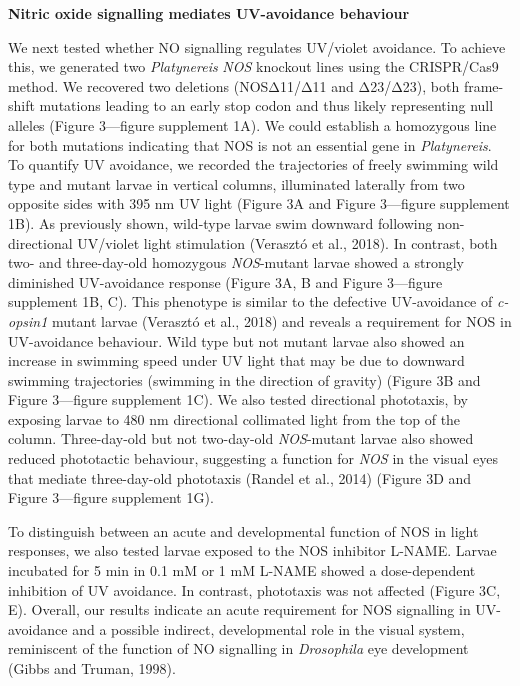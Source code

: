 \documentclass[
  10pt,
  onecolumn]{article}
\begin{document}
\textbf{Nitric oxide signalling mediates UV-avoidance behaviour}

We next tested whether NO signalling regulates UV/violet avoidance. To
achieve this, we generated two \emph{Platynereis} \emph{NOS} knockout
lines using the CRISPR/Cas9 method. We recovered two deletions
(NOSΔ11/Δ11 and Δ23/Δ23), both frame-shift mutations leading to an early
stop codon and thus likely representing null alleles (Figure 3---figure
supplement 1A). We could establish a homozygous line for both mutations
indicating that NOS is not an essential gene in \emph{Platynereis}. To
quantify UV avoidance, we recorded the trajectories of freely swimming
wild type and mutant larvae in vertical columns, illuminated laterally
from two opposite sides with 395 nm UV light (Figure 3A and Figure
3---figure supplement 1B). As previously shown, wild-type larvae swim
downward following non-directional UV/violet light stimulation (Verasztó
et al., 2018). In contrast, both two- and three-day-old homozygous
\emph{NOS}-mutant larvae showed a strongly diminished UV-avoidance
response (Figure 3A, B and Figure 3---figure supplement 1B, C). This
phenotype is similar to the defective UV-avoidance of \emph{c-opsin1}
mutant larvae (Verasztó et al., 2018) and reveals a requirement for NOS
in UV-avoidance behaviour. Wild type but not mutant larvae also showed
an increase in swimming speed under UV light that may be due to downward
swimming trajectories (swimming in the direction of gravity) (Figure 3B
and Figure 3---figure supplement 1C). We also tested directional
phototaxis, by exposing larvae to 480 nm directional collimated light
from the top of the column. Three-day-old but not two-day-old
\emph{NOS}-mutant larvae also showed reduced phototactic behaviour,
suggesting a function for \emph{NOS} in the visual eyes that mediate
three-day-old phototaxis (Randel et al., 2014) (Figure 3D and Figure
3---figure supplement 1G).

To distinguish between an acute and developmental function of NOS in
light responses, we also tested larvae exposed to the NOS inhibitor
L-NAME. Larvae incubated for 5 min in 0.1 mM or 1 mM L-NAME showed a
dose-dependent inhibition of UV avoidance. In contrast, phototaxis was
not affected (Figure 3C, E). Overall, our results indicate an acute
requirement for NOS signalling in UV-avoidance and a possible indirect,
developmental role in the visual system, reminiscent of the function of
NO signalling in \emph{Drosophila} eye development (Gibbs and Truman,
1998).
\end{document}
